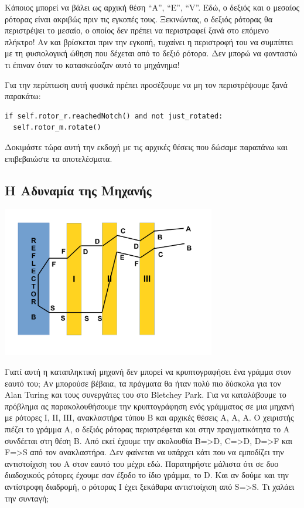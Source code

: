 \documentclass[a4paper,twoside,12pt]{article}
\begin{document}
Κάποιος μπορεί να βάλει ως αρχική θέση “A”, “E”, “V”. Εδώ, ο δεξιός και ο μεσαίος ρότορας είναι ακριβώς πριν τις εγκοπές τους. Ξεκινώντας, ο δεξιός ρότορας θα περιστρέψει το μεσαίο, ο οποίος δεν πρέπει να περιστραφεί ξανά στο επόμενο πλήκτρο! Αν και βρίσκεται πριν την εγκοπή, τυχαίνει η περιστροφή του να συμπίπτει με τη φυσιολογική ώθηση που δέχεται από το δεξιό ρότορα. Δεν μπορώ να φανταστώ τι έπιναν όταν το κατασκεύαζαν αυτό το μηχάνημα!

Για την περίπτωση αυτή φυσικά πρέπει προσέξουμε να μη τον περιστρέψουμε ξανά παρακάτω:

\begin{verbatim}
if self.rotor_r.reachedNotch() and not just_rotated:
  self.rotor_m.rotate()
\end{verbatim}

Δοκιμάστε τώρα αυτή την εκδοχή με τις αρχικές θέσεις που δώσαμε παραπάνω και επιβεβαιώστε τα αποτελέσματα. 

\subsection{Η Αδυναμία της Μηχανής}
%
\begin{center}
  \includegraphics[width=0.7\textwidth]{images/main/flaw}
\end{center}
%
Γιατί αυτή η καταπληκτική μηχανή δεν μπορεί να κρυπτογραφήσει ένα γράμμα στον εαυτό του; Αν μπορούσε βέβαια, τα πράγματα θα ήταν πολύ πιο δύσκολα για τον Alan Turing και τους συνεργάτες του στο Bletchey Park. Για να καταλάβουμε το πρόβλημα ας παρακολουθήσουμε την κρυπτογράφηση ενός γράμματος σε μια μηχανή με ρότορες Ι, ΙΙ, ΙΙΙ, ανακλαστήρα τύπου Β και αρχικές θέσεις Α, Α, Α. Ο χειριστής πιέζει το γράμμα Α, ο δεξιός ρότορας περιστρέφεται και στην πραγματικότητα το Α συνδέεται  στη θέση Β. Από εκεί έχουμε την ακολουθία B=>D, C=>D, D=>F και F=>S από τον ανακλαστήρα. Δεν φαίνεται να υπάρχει κάτι που να εμποδίζει την αντιστοίχιση του Α στον εαυτό του μέχρι εδώ. Παρατηρήστε μάλιστα ότι σε δυο διαδοχικούς ρότορες έχουμε σαν έξοδο το ίδιο γράμμα, το D. Και αν δούμε και την αντίστροφη διαδρομή, ο ρότορας Ι έχει ξεκάθαρα αντιστοίχιση από S=>S. Τι χαλάει την συνταγή;
\end{document}
